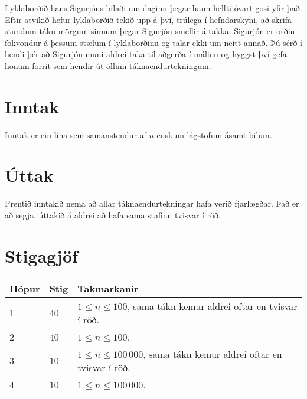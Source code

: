 
Lyklaborðið hans Sigurjóns bilaði um daginn þegar hann hellti óvart gosi yfir það. 
Eftir atvikið hefur lyklaborðið tekið upp á því, trúlega í hefndarskyni, 
að skrifa stundum tákn mörgum sinnum þegar Sigurjón smellir á takka. 
Sigurjón er orðin fokvondur á þessum stælum í lyklaborðinu og talar ekki um neitt annað.
Þú sérð í hendi þér að Sigurjón muni aldrei taka til aðgerða í málinu og hyggst því gefa honum
forrit sem hendir út öllum táknaendurtekningum. 

\section*{Inntak}
Inntak er ein lína sem samanstendur af $n$ enskum lágstöfum ásamt bilum.

\section*{Úttak}
Prentið inntakið nema að allar táknaendurtekningar hafa verið fjarlægðar. 
Það er að segja, úttakið á aldrei að hafa sama stafinn tvisvar í röð.

\section*{Stigagjöf}
\begin{tabular}{|l|l|l|}
\hline
Hópur & Stig & Takmarkanir \\ \hline
1     & 40   & $1 \leq n \leq 100$, sama tákn kemur aldrei oftar en tvisvar í röð. \\ \hline
2     & 40   & $1 \leq n \leq 100$. \\ \hline
3     & 10   & $1 \leq n \leq 100\,000$, sama tákn kemur aldrei oftar en tvisvar í röð. \\ \hline
4     & 10   & $1 \leq n \leq 100\,000$. \\ \hline
\end{tabular}
